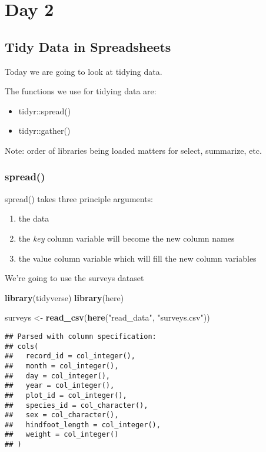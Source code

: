 \documentclass[]{article}
\newenvironment{Shaded}{\begin{snugshade}}{\end{snugshade}}
\newcommand{\KeywordTok}[1]{\textcolor[rgb]{0.13,0.29,0.53}{\textbf{#1}}}
\newcommand{\StringTok}[1]{\textcolor[rgb]{0.31,0.60,0.02}{#1}}
\newcommand{\NormalTok}[1]{#1}
\providecommand{\tightlist}{%
  \setlength{\itemsep}{0pt}\setlength{\parskip}{0pt}}
\begin{document}
\section{Day 2}\label{day-2}

\subsection{Tidy Data in Spreadsheets}\label{tidy-data-in-spreadsheets}

Today we are going to look at tidying data.

The functions we use for tidying data are:

\begin{itemize}
\tightlist
\item
  tidyr::spread()
\item
  tidyr::gather()
\end{itemize}

Note: order of libraries being loaded matters for select, summarize,
etc.

\subsubsection{spread()}\label{spread}

spread() takes three principle arguments:

\begin{enumerate}
\def\labelenumi{\arabic{enumi}.}
\tightlist
\item
  the data
\item
  the \emph{key} column variable will become the new column names
\item
  the value column variable which will fill the new column variables
\end{enumerate}

We're going to use the surveys dataset

\begin{Shaded}
\begin{Highlighting}[]
\KeywordTok{library}\NormalTok{(tidyverse)}
\KeywordTok{library}\NormalTok{(here)}

\NormalTok{surveys <-}\StringTok{ }\KeywordTok{read_csv}\NormalTok{(}\KeywordTok{here}\NormalTok{(}\StringTok{"read_data"}\NormalTok{, }\StringTok{"surveys.csv"}\NormalTok{))}
\end{Highlighting}
\end{Shaded}

\begin{verbatim}
## Parsed with column specification:
## cols(
##   record_id = col_integer(),
##   month = col_integer(),
##   day = col_integer(),
##   year = col_integer(),
##   plot_id = col_integer(),
##   species_id = col_character(),
##   sex = col_character(),
##   hindfoot_length = col_integer(),
##   weight = col_integer()
## )
\end{verbatim}
\end{document}
